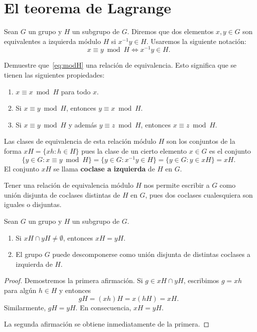 \chapter{El teorema de Lagrange}

Sean $G$ un grupo y $H$ un subgrupo de $G$. Diremos que dos elementos $x,y\in
G$ son equivalentes a izquierda módulo $H$ si $x^{-1}y\in H$.  
Usaremos la siguiente notación:
\begin{equation}
\label{eq:modH}	
x\equiv y\bmod
H\Longleftrightarrow x^{-1}y\in H.
\end{equation}

\begin{exercise}
	Demuestre que~\eqref{eq:modH} una relación de equivalencia. 
	Esto significa que se tienen las siguientes propiedades:
	\begin{enumerate}
	\item $x\equiv x\bmod H$ para todo $x$.
	\item Si $x\equiv y\bmod H$, entonces $y\equiv x\bmod H$.
	\item Si $x\equiv y\bmod H$ y además $y\equiv z\bmod H$, entonces $x\equiv z\bmod H$.  	
	\end{enumerate}
\end{exercise}

Las clases de equivalencia de esta relación módulo $H$ 
son los conjuntos de la forma $xH=\{xh:h\in H\}$
pues la clase de un cierto elemento $x\in G$ es el conjunto
\[
	\{y\in G:x\equiv y\bmod H\}=\{y\in G:x^{-1}y\in H\}=\{y\in G:y\in xH\}=xH.
\]
El conjunto $xH$ se 
llama \textbf{coclase a izquierda} de $H$ en $G$. 

Tener una relación de equivalencia módulo $H$ nos permite escribir a $G$ como
unión disjunta de coclases distintas de $H$ en $G$, pues dos
coclases cualesquiera son iguales o disjuntas. 

\begin{proposition}
Sean $G$ un grupo y $H$ un subgrupo de $G$.  
\begin{enumerate}
\item Si $xH\cap yH\ne\emptyset$, entonces $xH=yH$. 	
\item El grupo $G$ puede descomponerse como unión disjunta
de distintas coclases a izquierda de $H$. 
\end{enumerate}
\end{proposition}

\begin{proof}
Demostremos la primera afirmación. 
Si $g\in xH\cap yH$, escribimos
$g=xh$ para algún $h\in H$ y entonces
\[
gH=(xh)H=x(hH)=xH.
\]
Similarmente, $gH=yH$. En consecuencia, $xH=yH$.

La segunda afirmación se obtiene inmediatamente de la primera.  
\end{proof}

